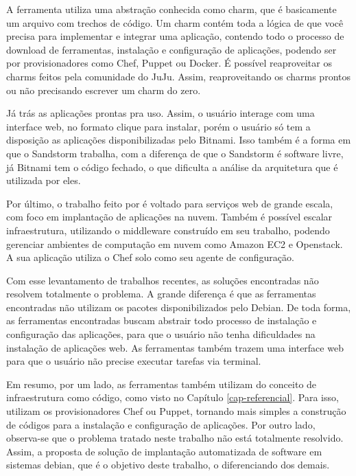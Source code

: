 A ferramenta  utiliza uma abstração conhecida como charm,
que é basicamente um arquivo com trechos de código. Um charm
contém toda a lógica de que você precisa para implementar e integrar uma aplicação,
contendo todo o processo de download de ferramentas, instalação e configuração de
aplicações, podendo ser por provisionadores como Chef, Puppet ou Docker. 
É possível reaproveitar os charms feitos pela comunidade do JuJu. Assim,
reaproveitando os charms prontos ou não precisando escrever um charm do zero.

Já  trás as aplicações prontas pra uso. Assim, o usuário interage com 
uma interface web, no formato clique para instalar, porém
o usuário só tem a disposição as aplicações disponibilizadas pelo Bitnami. Isso
também é a forma em que o Sandstorm trabalha, com a diferença de que o Sandstorm é
software livre, já Bitnami tem o código fechado, o que dificulta a análise da arquitetura
que é utilizada por eles. 

Por último, o trabalho feito por  é voltado
para serviços web de grande escala, com foco em implantação de aplicações na
nuvem. Também é possível escalar infraestrutura, utilizando o middleware construído 
em seu trabalho, podendo gerenciar ambientes de computação em nuvem como Amazon EC2 e 
Openstack. A sua aplicação utiliza o Chef solo como seu agente de configuração.

Com esse levantamento de trabalhos recentes, as soluções encontradas não resolvem totalmente
o problema. A grande diferença é que as ferramentas encontradas não utilizam os pacotes
disponibilizados pelo Debian. De toda forma, as ferramentas encontradas buscam
abstrair todo processo de instalação e configuração das aplicações, para que o
usuário não tenha dificuldades na instalação de aplicações web. As ferramentas também
trazem uma interface web para que o usuário não precise executar tarefas via terminal.

Em resumo, por um lado, as ferramentas também utilizam do conceito de
infraestrutura como código, como visto no Capítulo \ref{cap-referencial}. Para
isso, utilizam os provisionadores Chef ou Puppet, tornando mais simples a
construção de códigos para a instalação e configuração de aplicações. Por outro lado, 
observa-se que o problema tratado neste trabalho não está totalmente resolvido. Assim, 
a proposta de solução de implantação automatizada de software em sistemas debian, que é o objetivo deste trabalho, 
o diferenciando dos demais.

